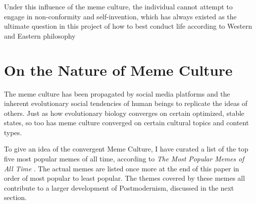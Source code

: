 \documentclass[12pt,letterpaper]{article}
\begin{document}
Under this influence of the meme culture, the individual cannot attempt to engage in non-conformity and self-invention, which has always existed as the ultimate question in this project of how to best conduct life according to Western and Eastern philosophy



%



\section{On the Nature of Meme Culture}
\label{meme}
The meme culture has been propagated by social media platforms and the inherent evolutionary social tendencies of human beings to replicate the ideas of others.  Just as how evolutionary biology converges on certain optimized, stable states, so too has meme culture converged on certain cultural topics and content types.

To give an idea of the convergent Meme Culture, I have curated a list of the top five most popular memes of all time, according to \textit{The Most Popular Memes of All Time} \cite{noauthor_list_2019-1}.  The actual memes are listed once more at the end of this paper in order of most popular to least popular.  The themes covered by these memes all contribute to a larger development of Postmodernism, discussed in the next section.
\end{document}
